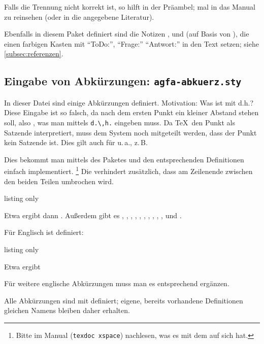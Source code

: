Falls die Trennung nicht korrekt ist, so hilft  in der Präambel; mal in das Manual zu  reinsehen (oder in die angegebene Literatur).

Ebenfalls in diesem Paket definiert sind die Notizen ,  und  (auf Basis von ), die einen farbigen Kasten mit \enquote{ToDo:}, \enquote{Frage:} \bzw \enquote{Antwort:} in den Text setzen; siehe \vref{subsec:referenzen}.
\subsection{Eingabe von Abkürzungen: \texttt{agfa-abkuerz.sty}}\label{agfa-abkuerz}
In dieser Datei sind einige Abkürzungen definiert. 
Motivation: Was ist mit d.h.? Diese Eingabe ist so falsch, da nach dem ersten Punkt ein kleiner Abstand stehen soll, also \dh, was man mittels \verb|d.\,h.| eingeben muss.
Da \TeX\ den Punkt als Satzende interpretiert, muss dem System noch mitgeteilt werden, dass der Punkt kein Satzende ist.
Dies gilt auch für u.\,a., z.\,B. \etc

Dies bekommt man mittels des Paketes  und den entsprechenden Definitionen einfach implementiert.%
\footnote{Bitte im Manual (\texttt{texdoc xspace}) nachlesen, was es mit dem  auf sich hat.} 
Die  verhindert zusätzlich, dass am Zeilenende zwischen den beiden Teilen umbrochen wird.
%
\begin{tcblisting}{listing only}
\providecommand{\zB}{\mbox{z.\,B.}\xspace}
\renewcommand{\dh}{\mbox{d.\,h.}\xspace}
\providecommand{\ua}{\mbox{u.\,a.}\xspace}
\providecommand{\og}{\mbox{o.\,g.}\xspace}
\providecommand{\iA}{\mbox{i.\,A.}\xspace}
\providecommand{\bzw}{bzw.\xspace}
\providecommand{\etc}{etc.\xspace}
\providecommand{\inkl}{inkl.\xspace}
\end{tcblisting}
%
Etwa  ergibt dann \ua.
Außerdem gibt es , , , , , , , , , ,  und .

Für Englisch ist definiert:
%
\begin{tcblisting}{listing only}
\providecommand{\eg}{\mbox{e.g.}\xspace}
\providecommand{\ie}{\mbox{i.e.}\xspace}
\end{tcblisting}
%
Etwa  ergibt \eg 

Für weitere englische Abkürzungen muss man es entsprechend ergänzen.

Alle Abkürzungen sind mit  definiert; eigene, bereits vorhandene Definitionen gleichen Namens bleiben daher erhalten.

